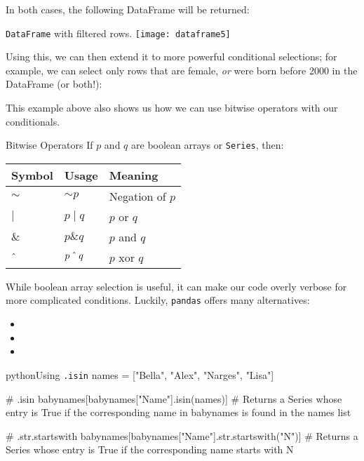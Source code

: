 \documentclass[openany]{book}
\begin{document}
In both cases, the following DataFrame will be returned:
\begin{figurebox}{\texttt{DataFrame} with filtered rows.}
	\centering\texttt{[image: dataframe5]}
\end{figurebox}

Using this, we can then extend it to more powerful conditional selections; for example, we can select only rows that are female, \textit{or} were born before 2000 in the DataFrame (or both!):
\begin{center}
\end{center}

This example above also shows us how we can use bitwise operators with our conditionals.

\begin{miscbox}{Bitwise Operators}
	If $p$ and $q$ are boolean arrays or \texttt{Series}, then:
	\begin{center}
		\begin{tabularx}{\textwidth}{|Y|Y|Y|}
			\hline
			\textbf{Symbol} & \textbf{Usage} & \textbf{Meaning} \\
			\hline
			$\sim$ & $\sim p$ & Negation of $p$ \\
			\hline
			$\mid$ & $p \mid q$ & $p$ or $q$ \\
			\hline
			$\&$ & $p \mathbin{\&} q$ & $p$ and $q$ \\
			\hline
			$\mathbin{\char`\^}$ & $p \mathbin{\char`\^} q$ & $p$ xor $q$ \\
			\hline
		\end{tabularx}
	\end{center}
\end{miscbox}

While boolean array selection is useful, it can make our code overly verbose for more complicated conditions. Luckily, \texttt{pandas} offers many alternatives:
\begin{itemize}
	\item {}
	\item {}
	\item {}
\end{itemize}

\begin{code}{python}{Using \texttt{.isin}}
names = ["Bella", "Alex", "Narges", "Lisa"]

# .isin
babynames[babynames["Name"].isin(names)] # Returns a Series whose entry is True if the corresponding name in babynames is found in the names list

# .str.startswith
babynames[babynames["Name"].str.startswith("N")] # Returns a Series whose entry is True if the corresponding name starts with N
\end{code}
\end{document}
